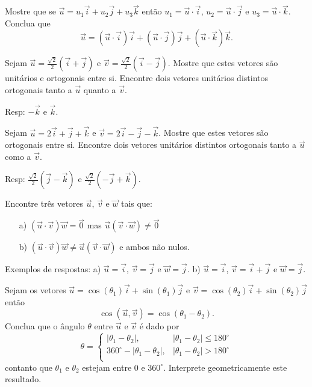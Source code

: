 \begin{exer}Mostre que se $\vec{u}=u_1\vec{i}+u_2\vec{j}+u_3\vec{k}$ então $u_1=\vec{u}\cdot\vec{i}$, $u_2=\vec{u}\cdot\vec{j}$ e $u_3=\vec{u}\cdot\vec{k}$. Conclua que
$$\vec{u}=\left(\vec{u}\cdot\vec{i}\right) \vec{i}+\left(\vec{u}\cdot\vec{j}\right) \vec{j}+\left(\vec{u}\cdot\vec{k}\right) \vec{k}.$$

\end{exer}

\begin{exer}\label{exort1}Sejam $\vec{u}=\frac{\sqrt{2}}{2}\left(\vec{i}+\vec{j}\right)$ e $\vec{v}=\frac{\sqrt{2}}{2}\left(\vec{i}-\vec{j}\right)$. Mostre que estes vetores são unitários e ortogonais entre si. Encontre dois vetores unitários distintos ortogonais tanto a $\vec{u}$ quanto a $\vec{v}$.
\end{exer}
Resp: $-\vec{k}$ e $\vec{k}$.

\begin{exer}\label{exort2} Sejam $\vec{u}=2\vec{i}+\vec{j}+\vec{k}$ e $\vec{v}=2\vec{i}-\vec{j}-\vec{k}$. Mostre que estes vetores são ortogonais entre si. Encontre dois vetores unitários distintos ortogonais tanto a  $\vec{u}$ como a $\vec{v}$.
\end{exer}
Resp: $\frac{\sqrt{2}}{2}\left(\vec{j}-\vec{k}\right)$ e $\frac{\sqrt{2}}{2}\left(-\vec{j}+\vec{k}\right)$.

\begin{exer} Encontre três vetores $\vec{u}$, $\vec{v}$ e $\vec{w}$ tais que:
\begin{itemize}
\item [a)] $\left(\vec{u}\cdot\vec{v}\right)\vec{w}=\vec{0}$ mas $\vec{u}\left(\vec{v}\cdot\vec{w}\right)\neq \vec{0}$ 
\item [b)] $\left(\vec{u}\cdot\vec{v}\right)\vec{w}\neq \vec{u}\left(\vec{v}\cdot\vec{w}\right)$ e ambos não nulos. 
\end{itemize}
\end{exer}

Exemplos de respostas: a) $\vec{u}=\vec{i}$, $\vec{v}=\vec{j}$ e $\vec{w}=\vec{j}$. b) $\vec{u}=\vec{i}$, $\vec{v}=\vec{i}+\vec{j}$ e $\vec{w}=\vec{j}$.

\begin{exer} Sejam os vetores $\vec{u}=\cos(\theta_1)\vec{i}+\sin(\theta_1)\vec{j}$ e $\vec{v}=\cos(\theta_2)\vec{i}+\sin(\theta_2)\vec{j}$ então
$$\cos\left(\vec{u},\vec{v}\right)=\cos(\theta_1-\theta_2).$$
Conclua que o ângulo $\theta$ entre $\vec{u}$ e $\vec{v}$ é dado por
$$\theta=\left\{
\begin{array}{ll}
|\theta_1-\theta_2|,& |\theta_1-\theta_2|\leq 180^\circ\\
360^\circ-|\theta_1-\theta_2|,& |\theta_1-\theta_2|> 180^\circ\\
\end{array}
\right.$$ 
contanto que $\theta_1$ e $\theta_2$ estejam entre $0$ e $360^\circ$.
Interprete geometricamente este resultado.
\end{exer}

